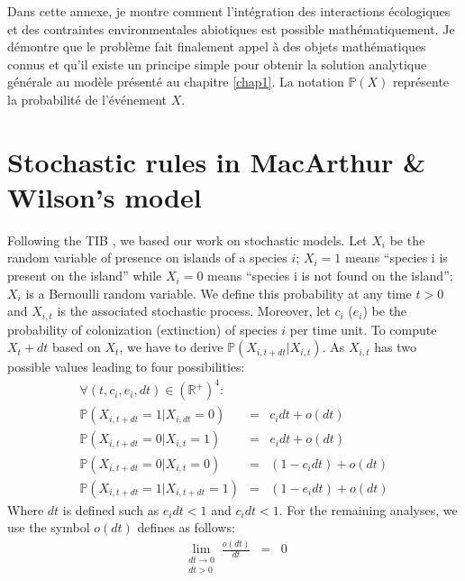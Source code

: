 \label{annII}
\addtocounter{chapter}{1}
\setcounter{equation}{0}

Dans cette annexe, je montre comment l'intégration des interactions écologiques
et des contraintes environmentales abiotiques est possible mathématiquement.
Je démontre que le problème fait finalement appel à des objets mathématiques
connus et qu'il existe un principe simple pour obtenir la solution analytique
générale au modèle présenté au chapitre \ref{chap1}. La notation $\mathbb{P}(X)$
représente la probabilité de l'événement $X$.

\section{Stochastic rules in MacArthur \& Wilson's model}

Following the TIB \cite{MacArthur1967}, we based our work on stochastic models. Let $X_{i}$ be the random variable of presence on islands of a species $i$; $X_i=1$ means ``species i is present on the island'' while $X_i=0$ means ``species i is not found on the island''; $X_i$ is a Bernoulli random variable. We define this probability at any time $t>0$ and $X_{i,t}$ is the associated stochastic process. Moreover, let $c_i$ ($e_i$) be the probability of colonization (extinction) of species $i$ per time unit. To compute $X_t+dt$ based on $X_t$, we have to derive $ \mathbb{P}(X_{i,t+dt}|X_{i,t})$. As $X_{i,t}$ has two possible values leading to four possibilities:
\begin{eqnarray}
\nonumber \forall (t,c_i, e_i,dt)\in (\mathbb{R}^{+})^{4}: & &  \\
\label{eqAnn2_1} \mathbb{P}(X_{i,t+dt}=1|X_{i,dt}=0)&=&c_idt+o(dt)\\
\label{eqAnn2_2} \mathbb{P}(X_{i,t+dt}=0|X_{i,t}=1)&=&e_idt+o(dt) \\
\label{eqAnn2_3} \mathbb{P}(X_{i,t+dt}=0|X_{i,t}=0)&=&(1-c_idt)+o(dt) \\
\label{eqAnn2_4} \mathbb{P}(X_{i,t+dt}=1|X_{i,t+dt}=1)&=&(1-e_idt)+o(dt)
\end{eqnarray}
Where $dt$ is defined such as $e_idt<1$ and $c_idt<1$. For the remaining analyses, we use the symbol $o(dt)$ defines as follows:
\begin{eqnarray}
\nonumber \lim\limits_{\substack{dt \to 0 \\ dt>0}}\frac{o(dt)}{dt}&=&0
\end{eqnarray}

